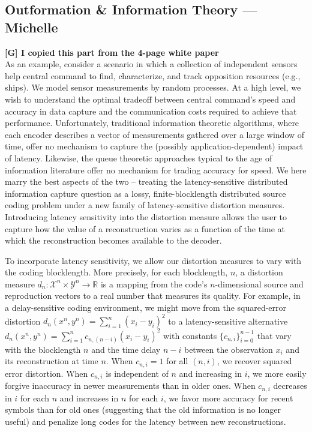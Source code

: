 \documentclass[12pt,letterpaper]{article}
\begin{document}
\subsection{Outformation \& Information Theory --- Michelle}

\textbf{[G] I copied this part from the 4-page white paper}\\
As an example, consider a scenario in which a collection of independent sensors help central command to find, characterize, and track opposition resources (e.g., ships). We model sensor measurements by random processes. At a high level, we wish to understand the optimal tradeoff between central command’s speed and accuracy in data capture and the communication costs required to achieve that performance. Unfortunately, traditional information theoretic algorithms, where each encoder describes a vector of measurements gathered over a large window of time, offer no mechanism to capture the (possibly application-dependent) impact of latency. Likewise, the queue theoretic approaches typical to the age of information literature offer no mechanism for trading accuracy for speed. We here marry the best aspects of the two – treating the latency-sensitive distributed information capture question as a lossy, finite-blocklength distributed source coding problem under a new family of latency-sensitive distortion measures. Introducing latency sensitivity into the distortion measure allows the user to capture how the value of a reconstruction varies as a function of the time at which the reconstruction becomes available to the decoder. 

To incorporate latency sensitivity, we allow our distortion measures to vary with the coding blocklength. More precisely, for each blocklength, $n$, a distortion measure $d_n \colon \mathcal{X}^n \times \mathcal{Y}^n \to \mathbb{R}$ is a mapping from the code's $n$-dimensional source and reproduction vectors to a real number that measures its quality. For example, in a delay-sensitive coding environment, we might move from the squared-error distortion 
$d_n(x^n,y^n)=\sum_{i=1}^n (x_i - y_i )^2$ to a latency-sensitive alternative $d_n(x^n,y^n)=\sum_{i=1}^n c_{n,(n-i)} (x_i - y_i )^2$ with constants $\{c_{n,i}\}_{i=0}^{n-1}$ that vary with the blocklength $n$ and the time delay $n-i$ between the observation $x_i$ and its reconstruction at time $n$. When $c_{n,i}=1$ for all $(n,i)$, we recover squared error distortion. When $c_{n,i}$ is independent of $n$ and increasing in $i$, we more easily forgive inaccuracy in newer measurements than in older ones. When $c_{n,i}$ decreases in $i$ for each $n$ and increases in $n$ for each $i$, we favor more accuracy for recent symbols than for old ones (suggesting that the old information is no longer useful) and penalize long codes for the latency between new reconstructions.
\end{document}
